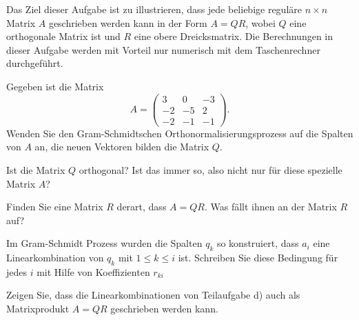 %
%
%
%
%
%
Das Ziel dieser Aufgabe ist zu illustrieren, dass jede beliebige reguläre 
$n\times n$ Matrix $A$ geschrieben werden kann in der Form $A=QR$,
wobei $Q$ eine orthogonale Matrix ist und $R$ eine obere Dreicksmatrix.
Die Berechnungen in dieser Aufgabe werden mit Vorteil nur numerisch mit
dem Taschenrechner durchgeführt.
\begin{teilaufgaben}
\item
Gegeben ist die Matrix 
\[
A=\begin{pmatrix}
 3& 0&-3\\
-2&-5& 2\\
-2&-1&-1
\end{pmatrix}.
\]
Wenden Sie den Gram-Schmidtschen Orthonormalisierungsprozess auf
die Spalten von $A$ an, die neuen Vektoren bilden die Matrix $Q$.
\item
Ist die Matrix $Q$ orthogonal?
Ist das immer so, also nicht nur für diese spezielle Matrix $A$?
\item
Finden Sie eine Matrix $R$ derart, dass $A=QR$.
Was fällt ihnen an der Matrix $R$ auf?
\item 
Im Gram-Schmidt Prozess wurden die Spalten $q_k$ so konstruiert, dass
$a_i$ eine Linearkombination von $q_k$ mit $1\le k\le i$ ist.
Schreiben Sie diese Bedingung für jedes $i$ mit Hilfe von Koeffizienten
$r_{ki}$
\item
Zeigen Sie, dass die Linearkombinationen von Teilaufgabe d) auch
als Matrixprodukt $A=QR$
geschrieben werden kann.
\end{teilaufgaben}


